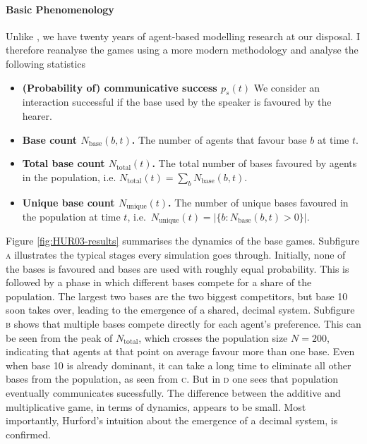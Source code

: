 \documentclass{../src/bcthesispart}
\begin{document}
\paragraph{Basic Phenomenology}

Unlike \textcite{Hurford1987}, we have twenty years of agent-based modelling research at our disposal. 
I therefore reanalyse the games using a more modern methodology and analyse the following statistics
\begin{itemize}
	\item \textbf{(Probability of) communicative success $p_s(t)$} We consider an interaction successful if the base used by the speaker is favoured by the hearer. 
	\item \textbf{Base count $N_{\text{base}}(b, t)$.} 
		The number of agents that favour base $b$ at time $t$.
	\item \textbf{Total base count $N_{\text{total}}(t)$.} 
		The total number of bases favoured by agents in the population, i.e.
		$N_{\text{total}}(t) = \sum_b N_{\text{base}}(b, t)$.
	\item \textbf{Unique base count $N_{\text{unique}}(t)$.} The number of unique bases favoured in the population at time $t$, i.e.\ $N_{\text{unique}}(t) = |\{b: N_{\text{base}}(b, t) > 0\}|$.
\end{itemize}





Figure \ref{fig:HUR03-results} summarises the dynamics of the base games.
Subfigure \textsc{a} illustrates the typical stages every simulation goes through.
Initially, none of the bases is favoured and bases are used with roughly equal probability.
This is followed by a phase in which different bases compete for a share of the population.
The largest two bases are the two biggest competitors, but base 10 soon takes over, leading to the emergence of a shared, decimal system.
Subfigure \textsc{b} shows that multiple bases compete directly for each agent’s preference. 
This can be seen from the peak of $N_{\text{total}}$, which crosses the population size $N=200$, indicating that agents at that point on average favour more than one base.
Even when base 10 is already dominant, it can take a long time to eliminate all other bases from the population, as seen from \textsc{c}.
But in \textsc{d} one sees that population eventually communicates sucessfully.
The difference between the additive and multiplicative game, in terms of dynamics, appears to be small.
Most importantly, Hurford’s intuition about the emergence of a decimal system, is confirmed.
\end{document}
